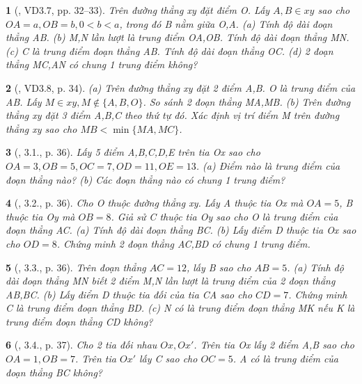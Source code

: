 \documentclass{article}
\newtheorem{baitoan}{}
\begin{document}
\begin{baitoan}[\cite{TLCT_THCS_Toan_6_hinh_hoc}, VD3.7, pp. 32--33]
	Trên đường thẳng xy đặt điểm O. Lấy $A,B\in xy$ sao cho $OA = a,OB = b,0 < b < a$, trong đó B nằm giữa O,A. (a) Tính độ dài đoạn thẳng AB. (b) M,N lần lượt là trung điểm OA,OB. Tính độ dài đoạn thẳng MN. (c) C là trung điểm đoạn thẳng AB. Tính độ dài đoạn thẳng OC. (d) 2 đoạn thẳng MC,AN có chung 1 trung điểm không?
\end{baitoan}

\begin{baitoan}[\cite{TLCT_THCS_Toan_6_hinh_hoc}, VD3.8, p. 34]
	(a) Trên đường thẳng xy đặt 2 điểm A,B. O là trung điểm của AB. Lấy $M\in xy,M\notin\{A,B,O\}$. So sánh 2 đoạn thẳng MA,MB. (b) Trên đường thẳng xy đặt 3 điểm A,B,C theo thứ tự đó. Xác định vị trí điểm M trên đường thẳng xy sao cho $MB < \min\{MA,MC\}$.
\end{baitoan}

\begin{baitoan}[\cite{TLCT_THCS_Toan_6_hinh_hoc}, 3.1., p. 36]
	Lấy 5 điểm A,B,C,D,E trên tia Ox sao cho $OA = 3,OB = 5,OC = 7,OD = 11,OE = 13$. (a) Điểm nào là trung điểm của đoạn thẳng nào? (b) Các đoạn thẳng nào có chung 1 trung điểm?
\end{baitoan}

\begin{baitoan}[\cite{TLCT_THCS_Toan_6_hinh_hoc}, 3.2., p. 36]
	Cho O thuộc đường thẳng xy. Lấy A thuộc tia Ox mà $OA = 5$, B thuộc tia Oy mà $OB = 8$. Giả sử C thuộc tia Oy sao cho O là trung điểm của đoạn thẳng AC. (a) Tính độ dài đoạn thẳng BC. (b) Lấy điểm D thuộc tia Ox sao cho $OD = 8$. Chứng minh 2 đoạn thẳng AC,BD có chung 1 trung điểm.
\end{baitoan}

\begin{baitoan}[\cite{TLCT_THCS_Toan_6_hinh_hoc}, 3.3., p. 36]
	Trên đoạn thẳng $AC = 12$, lấy B sao cho $AB = 5$. (a) Tính độ dài đoạn thẳng MN biết 2 điểm M,N lần lượt là trung điểm của 2 đoạn thẳng AB,BC. (b) Lấy điểm D thuộc tia đối của tia CA sao cho $CD = 7$. Chứng minh C là trung điểm đoạn thẳng BD. (c) N có là trung điểm đoạn thẳng MK nếu K là trung điểm đoạn thẳng CD không?
\end{baitoan}

\begin{baitoan}[\cite{TLCT_THCS_Toan_6_hinh_hoc}, 3.4., p. 37]
	Cho 2 tia đối nhau $Ox,Ox'$. Trên tia Ox lấy 2 điểm A,B sao cho $OA = 1,OB = 7$. Trên tia $Ox'$ lấy C sao cho $OC = 5$. A có là trung điểm của đoạn thẳng BC không?
\end{baitoan}
\end{document}
